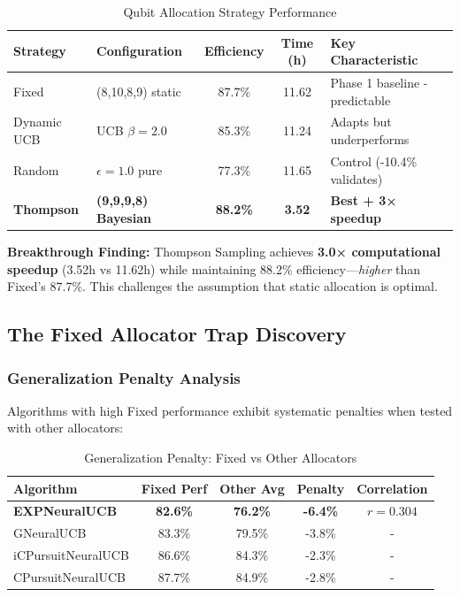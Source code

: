 \documentclass[11pt,a4paper]{article}
\newcommand{\critical}[1]{\textcolor{criticalcolor}{\textbf{#1}}}
\newcommand{\success}[1]{\textcolor{successcolor}{\textbf{#1}}}
\begin{document}
\begin{table}[H]
\centering
\footnotesize
\caption{Qubit Allocation Strategy Performance}
\begin{tabular}{|l|p{2.5cm}|c|c|p{4cm}|}
\hline
\textbf{Strategy} & \textbf{Configuration} & \textbf{Efficiency} & \textbf{Time (h)} & \textbf{Key Characteristic} \\
\hline
\hline
Fixed & (8,10,8,9) static & 87.7\% & 11.62 & Phase 1 baseline - predictable \\
Dynamic UCB & UCB $\beta=2.0$ & 85.3\% & 11.24 & Adapts but underperforms \\
Random & $\epsilon=1.0$ pure & 77.3\% & 11.65 & Control (-10.4\% validates) \\
\success{Thompson} & \success{(9,9,9,8) Bayesian} & \success{88.2\%} & \success{3.52} & \success{Best + 3× speedup} \\
\hline
\end{tabular}
\end{table}

\textbf{Breakthrough Finding:} Thompson Sampling achieves \success{3.0× computational speedup} (3.52h vs 11.62h) while maintaining 88.2\% efficiency—\textit{higher} than Fixed's 87.7\%. This challenges the assumption that static allocation is optimal.

\subsection{The Fixed Allocator Trap Discovery}

\subsubsection{Generalization Penalty Analysis}

Algorithms with high Fixed performance exhibit systematic penalties when tested with other allocators:

\begin{table}[H]
\centering
\small
\caption{Generalization Penalty: Fixed vs Other Allocators}
\begin{tabular}{|l|c|c|c|c|}
\hline
\textbf{Algorithm} & \textbf{Fixed Perf} & \textbf{Other Avg} & \textbf{Penalty} & \textbf{Correlation} \\
\hline
\hline
\critical{EXPNeuralUCB} & \critical{82.6\%} & \critical{76.2\%} & \critical{-6.4\%} & \critical{$r=0.304$} \\
GNeuralUCB & 83.3\% & 79.5\% & -3.8\% & - \\
iCPursuitNeuralUCB & 86.6\% & 84.3\% & -2.3\% & - \\
CPursuitNeuralUCB & 87.7\% & 84.9\% & -2.8\% & - \\
\hline
\end{tabular}
\end{table}
\end{document}
